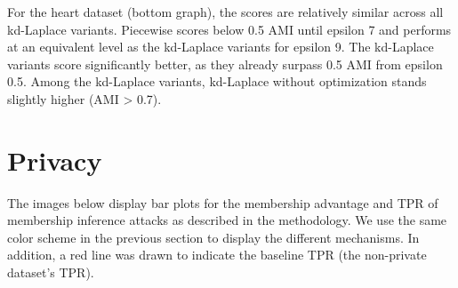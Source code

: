 For the heart dataset (bottom graph), the scores are relatively similar across all kd-Laplace variants. Piecewise scores below 0.5 AMI until epsilon 7 and performs at an equivalent level as the kd-Laplace variants for epsilon 9. The kd-Laplace variants score significantly better, as they already surpass 0.5 AMI from epsilon 0.5. Among the kd-Laplace variants, kd-Laplace without optimization stands slightly higher (AMI > 0.7).

\newpage
\section{Privacy}
The images below display bar plots for the membership advantage and TPR of membership inference attacks as described in the methodology.
We use the same color scheme in the previous section to display the different mechanisms.
In addition, a red line was drawn to indicate the baseline TPR (the non-private dataset's TPR). \newline
